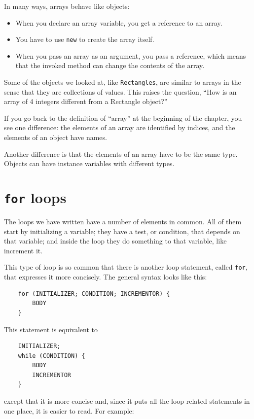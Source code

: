 \documentclass[12pt]{book}
\theoremstyle{exercise}
\begin{document}
In many ways, arrays behave like objects:

\begin{itemize}

\item When you declare an array variable, you get a reference
to an array.

\item You have to use {\tt new} to create the array itself.

\item When you pass an array as an argument, you pass a reference,
which means that the invoked method can change the contents
of the array.

\end{itemize}

Some of the objects we looked at, like {\tt Rectangles}, are
similar to arrays in the sense that they are collections of
values.  This raises the question, ``How is an array of 4 integers
different from a Rectangle object?''

If you go back to the definition of ``array'' at the beginning
of the chapter, you see one difference: the
elements of an array are identified by indices, and the
elements of an object have names.

Another difference is that the
elements of an array have to be the same type.  Objects can
have instance variables with different types.


\section{{\tt for} loops}
\label{for}

The loops we have written have a number of elements
in common.  All of them start by initializing a variable;
they have a test, or condition, that depends on that variable;
and inside the loop they do something to that variable,
like increment it.


This type of loop is so common that there is another
loop statement, called {\tt for}, that expresses it more
concisely.  The general syntax looks like this:

\begin{lstlisting}
    for (INITIALIZER; CONDITION; INCREMENTOR) {
        BODY
    }
\end{lstlisting}
%
This statement is equivalent to

\begin{lstlisting}
    INITIALIZER;
    while (CONDITION) {
        BODY
        INCREMENTOR
    }
\end{lstlisting}
%
except that it is more concise and, since it puts all the
loop-related statements in one place, it is easier to read.
For example:
\end{document}
